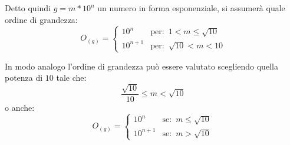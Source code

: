 Detto quindi $g=m*10^n$ un numero in forma esponenziale, si assumerà quale ordine di grandezza:
\begin{equation}
 O_{(g)} = \begin{cases}
             10^n     & \text{per: }\, 1 < m \leq \sqrt{10} \\
             10^{n+1} & \text{per: }\, \sqrt{10} < m < 10
           \end{cases}\label{eq:odg_1}
\end{equation}

In modo analogo l'ordine di grandezza può essere valutato scegliendo quella potenza di $10$ tale che:
\begin{equation}
 \frac{\sqrt{10}}{10} \leq m < \sqrt{10}\label{eq:odg_2}
\end{equation}
o anche:
\begin{equation}
 O_{(g)} = \begin{cases}
             10^n     & \text{se: }\, m \leq \sqrt{10} \\
             10^{n+1} & \text{se: }\, m > \sqrt{10}
           \end{cases}\label{eq:odg_3}
\end{equation}

